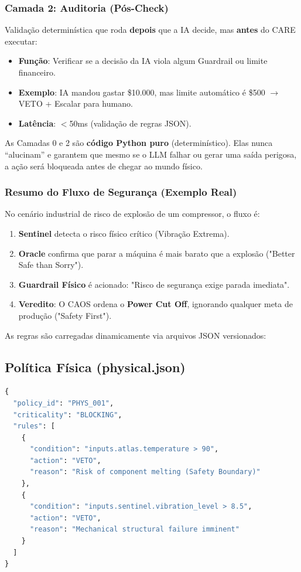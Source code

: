 \documentclass[12pt, a4paper]{article}
\begin{document}
\subsubsection{Camada 2: Auditoria (Pós-Check)}
Validação determinística que roda \textbf{depois} que a IA decide, mas \textbf{antes} do CARE executar:
\begin{itemize}
    \item \textbf{Função}: Verificar se a decisão da IA viola algum Guardrail ou limite financeiro.
    \item \textbf{Exemplo}: IA mandou gastar \$10.000, mas limite automático é \$500 $\rightarrow$ VETO + Escalar para humano.
    \item \textbf{Latência}: $<$50ms (validação de regras JSON).
\end{itemize}

\begin{avisobox}
As Camadas 0 e 2 são \textbf{código Python puro} (determinístico). Elas nunca ``alucinam'' e garantem que mesmo se o LLM falhar ou gerar uma saída perigosa, a ação será bloqueada antes de chegar ao mundo físico.
\end{avisobox}



\subsubsection{Resumo do Fluxo de Segurança (Exemplo Real)}
No cenário industrial de risco de explosão de um compressor, o fluxo é:
\begin{enumerate}
    \item \textbf{Sentinel} detecta o risco físico crítico (Vibração Extrema).
    \item \textbf{Oracle} confirma que parar a máquina é mais barato que a explosão ("Better Safe than Sorry").
    \item \textbf{Guardrail Físico} é acionado: "Risco de segurança exige parada imediata".
    \item \textbf{Veredito}: O CAOS ordena o \textbf{Power Cut Off}, ignorando qualquer meta de produção ("Safety First").
\end{enumerate}

As regras são carregadas dinamicamente via arquivos JSON versionados:

\subsection{Política Física (physical.json)}
\begin{lstlisting}[language=Python, caption=Regra de Segurança Térmica]
{
  "policy_id": "PHYS_001",
  "criticality": "BLOCKING",
  "rules": [
    {
      "condition": "inputs.atlas.temperature > 90",
      "action": "VETO",
      "reason": "Risk of component melting (Safety Boundary)"
    },
    {
      "condition": "inputs.sentinel.vibration_level > 8.5",
      "action": "VETO",
      "reason": "Mechanical structural failure imminent"
    }
  ]
}
\end{lstlisting}
\end{document}
